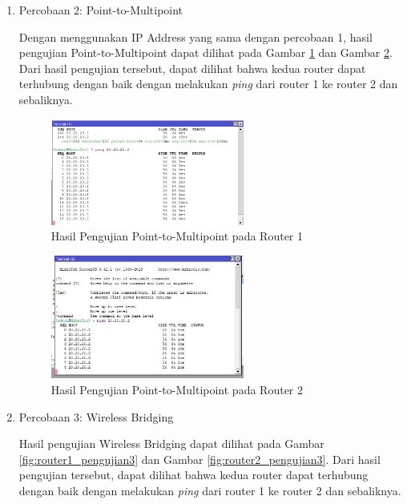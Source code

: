 \begin {enumerate}
    \item Percobaan 2: Point-to-Multipoint
    
    Dengan menggunakan IP Address yang sama dengan percobaan 1, hasil pengujian Point-to-Multipoint dapat dilihat pada Gambar \ref{fig:router1_pengujian2} dan Gambar \ref{fig:router2_pengujian2}. Dari hasil pengujian tersebut, dapat dilihat bahwa kedua router dapat terhubung dengan baik dengan melakukan \textit{ping} dari router 1 ke router 2 dan sebaliknya.

    \begin{figure}[H]
        \centering
        \includegraphics[width=0.6\textwidth]{img/router_1_pengujian2.jpeg}
        \caption{Hasil Pengujian Point-to-Multipoint pada Router 1}
        \label{fig:router1_pengujian2}
    \end{figure}

    \begin{figure}[H]
        \centering
        \includegraphics[width=0.6\textwidth]{img/router_2_pengujian1.jpeg}
        \caption{Hasil Pengujian Point-to-Multipoint pada Router 2}
        \label{fig:router2_pengujian2}
    \end{figure}
    
    \item Percobaan 3: Wireless Bridging
    
    Hasil pengujian Wireless Bridging dapat dilihat pada Gambar \ref{fig:router1_pengujian3} dan Gambar \ref{fig:router2_pengujian3}. Dari hasil pengujian tersebut, dapat dilihat bahwa kedua router dapat terhubung dengan baik dengan melakukan \textit{ping} dari router 1 ke router 2 dan sebaliknya.


\end{enumerate}
